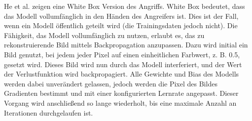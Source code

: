 He et al. \cite{P-5} zeigen eine White Box Version des Angriffs. 
White Box bedeutet, dass das Modell vollumfänglich in den Händen des Angreifers ist.
Dies ist der Fall, wenn ein Modell öffentlich geteilt wird (die Trainingsdaten jedoch nicht).
Die Fähigkeit, das Modell vollumfänglich zu nutzen, erlaubt es, das zu rekonstruierende Bild mittels Backpropagation anzupassen. 
Dazu wird initial ein Bild genutzt, bei jedem jeder Pixel auf einen einheitlichen Farbwert, z. B. 0.5, gesetzt wird.
Dieses Bild wird nun durch das Modell interferiert, und der Wert der Verlustfunktion wird backpropagiert. 
Alle Gewichte und Bias des Modells werden dabei unverändert gelassen, jedoch werden die Pixel des Bildes Gradienten bestimmt und mit einer konfigurierten Lernrate angepasst.
Dieser Vorgang wird anschließend so lange wiederholt, bis eine maximale Anzahl an Iterationen durchgelaufen ist.


